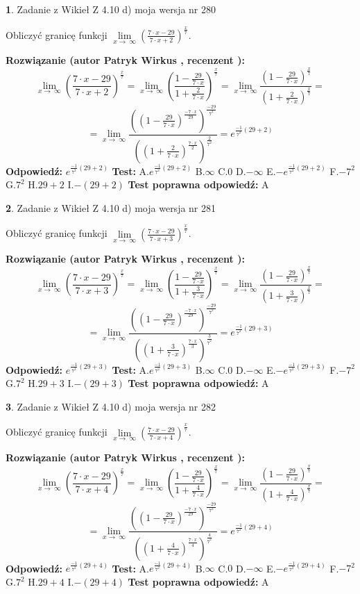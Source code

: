 \documentclass[12pt, a4paper]{article}
\theoremstyle{definition} %
\newtheorem{zad}{}
\newcommand{\zadStart}[1]{\begin{zad}#1\newline}
\newcommand{\zadStop}{\end{zad}}
\newcommand{\rozwStart}[2]{\noindent \textbf{Rozwiązanie (autor #1 , recenzent #2): }\newline}
\newcommand{\rozwStop}{\newline}
\newcommand{\odpStart}{\noindent \textbf{Odpowiedź:}\newline}
\newcommand{\odpStop}{\newline}
\newcommand{\testStart}{\noindent \textbf{Test:}\newline}
\newcommand{\testStop}{\newline}
\newcommand{\kluczStart}{\noindent \textbf{Test poprawna odpowiedź:}\newline}
\newcommand{\kluczStop}{\newline}
\begin{document}
\zadStart{Zadanie z Wikieł Z 4.10 d) moja wersja nr 280}


Obliczyć granicę funkcji  $\lim\limits_{x\to\ \infty}(\frac{7\cdot x-29}{7\cdot x+2})^{\frac{x}{7}}$.
\zadStop
\rozwStart{Patryk Wirkus}{}
$$\lim\limits_{x\to\ \infty}(\frac{7\cdot x-29}{7\cdot x+2})^{\frac{x}{7}} = \lim\limits_{x\to\ \infty}(\frac{1-\frac{29}{7\cdot x}}{1+\frac{2}{7\cdot x}})^{\frac{x}{7}}=\lim\limits_{x\to\ \infty}\frac{(1-\frac{29}{7\cdot x})^{\frac{x}{7}}}{(1+\frac{2}{7\cdot x})^{\frac{x}{7}}}=$$
$$=\lim\limits_{x\to\ \infty}\frac{((1-\frac{29}{7\cdot x})^{\frac{-7\cdot x}{29}})^{\frac{-29}{7^{2}}}}{((1+\frac{2}{7\cdot x})^{\frac{7\cdot x}{2}})^{\frac{2}{7^{2}}}}=e^{\frac{-1}{7^{2}}(29+2)}$$
\rozwStop
\odpStart
$e^{\frac{-1}{7^{2}}(29+2)}$
\odpStop
\testStart
A.$e^{\frac{-1}{7^{2}}(29+2)}$ B.$\infty$ C.$0$ D.$-\infty$ E.$-e^{\frac{-1}{7^{2}}(29+2)}$
F.$-7^{2}$ G.$7^{2}$
H.$29+2$
I.$-(29+2)$
\testStop
\kluczStart
A
\kluczStop



\zadStart{Zadanie z Wikieł Z 4.10 d) moja wersja nr 281}


Obliczyć granicę funkcji  $\lim\limits_{x\to\ \infty}(\frac{7\cdot x-29}{7\cdot x+3})^{\frac{x}{7}}$.
\zadStop
\rozwStart{Patryk Wirkus}{}
$$\lim\limits_{x\to\ \infty}(\frac{7\cdot x-29}{7\cdot x+3})^{\frac{x}{7}} = \lim\limits_{x\to\ \infty}(\frac{1-\frac{29}{7\cdot x}}{1+\frac{3}{7\cdot x}})^{\frac{x}{7}}=\lim\limits_{x\to\ \infty}\frac{(1-\frac{29}{7\cdot x})^{\frac{x}{7}}}{(1+\frac{3}{7\cdot x})^{\frac{x}{7}}}=$$
$$=\lim\limits_{x\to\ \infty}\frac{((1-\frac{29}{7\cdot x})^{\frac{-7\cdot x}{29}})^{\frac{-29}{7^{2}}}}{((1+\frac{3}{7\cdot x})^{\frac{7\cdot x}{3}})^{\frac{3}{7^{2}}}}=e^{\frac{-1}{7^{2}}(29+3)}$$
\rozwStop
\odpStart
$e^{\frac{-1}{7^{2}}(29+3)}$
\odpStop
\testStart
A.$e^{\frac{-1}{7^{2}}(29+3)}$ B.$\infty$ C.$0$ D.$-\infty$ E.$-e^{\frac{-1}{7^{2}}(29+3)}$
F.$-7^{2}$ G.$7^{2}$
H.$29+3$
I.$-(29+3)$
\testStop
\kluczStart
A
\kluczStop



\zadStart{Zadanie z Wikieł Z 4.10 d) moja wersja nr 282}


Obliczyć granicę funkcji  $\lim\limits_{x\to\ \infty}(\frac{7\cdot x-29}{7\cdot x+4})^{\frac{x}{7}}$.
\zadStop
\rozwStart{Patryk Wirkus}{}
$$\lim\limits_{x\to\ \infty}(\frac{7\cdot x-29}{7\cdot x+4})^{\frac{x}{7}} = \lim\limits_{x\to\ \infty}(\frac{1-\frac{29}{7\cdot x}}{1+\frac{4}{7\cdot x}})^{\frac{x}{7}}=\lim\limits_{x\to\ \infty}\frac{(1-\frac{29}{7\cdot x})^{\frac{x}{7}}}{(1+\frac{4}{7\cdot x})^{\frac{x}{7}}}=$$
$$=\lim\limits_{x\to\ \infty}\frac{((1-\frac{29}{7\cdot x})^{\frac{-7\cdot x}{29}})^{\frac{-29}{7^{2}}}}{((1+\frac{4}{7\cdot x})^{\frac{7\cdot x}{4}})^{\frac{4}{7^{2}}}}=e^{\frac{-1}{7^{2}}(29+4)}$$
\rozwStop
\odpStart
$e^{\frac{-1}{7^{2}}(29+4)}$
\odpStop
\testStart
A.$e^{\frac{-1}{7^{2}}(29+4)}$ B.$\infty$ C.$0$ D.$-\infty$ E.$-e^{\frac{-1}{7^{2}}(29+4)}$
F.$-7^{2}$ G.$7^{2}$
H.$29+4$
I.$-(29+4)$
\testStop
\kluczStart
A
\kluczStop
\end{document}
